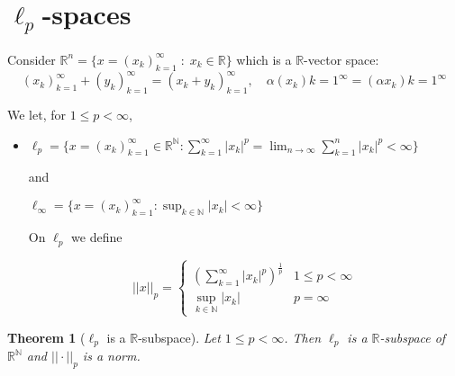 \documentclass[11pt, oneside]{book}
\theoremstyle{break}
\newtheorem{thm}{Theorem}[section]
\newcommand{\bb}[1]{\mathbb{#1}}			%
\begin{document}
\section{\texorpdfstring{$\ell_p$}{lp}-spaces}\label{sect:lp spaces}

Consider $\bb{R}^n = \{x = (x_k)_{k=1}^\infty \; : \; x_k \in \bb{R}\}$ which is a $\bb{R}$-vector space:
\begin{equation}
	(x_k)_{k=1}^\infty + (y_k)_{k=1}^\infty = (x_k + y_k)_{k = 1}^\infty, \quad \alpha(x_k){k=1}^\infty = (\alpha x_k){k=1}^\infty
\end{equation}

We let, for $1 \leq p < \infty$,
\begin{itemize}
	\item $\ell_p = \{x = (x_k)_{k=1}^\infty \in \bb{R}^\bb{N} : \sum_{k=1}^{\infty} |x_k|^p = \lim_{n \to \infty} \sum_{k=1}^{n} |x_k|^p < \infty \}$
		
		and

		$\ell_\infty = \{x = (x_k)_{k=1}^\infty : \sup_{k \in \bb{N}} |x_k| < \infty \}$

		On $\ell_p$ we define

		\begin{equation}
			||x||_p =
			\begin{cases}
				\left( \sum_{k=1}^{\infty} |x_k|^p \right)^{\frac{1}{p}}	&	1 \leq p < \infty \\
				\sup_{k \in \bb{N}} |x_k|		&		p = \infty
			\end{cases}
		\end{equation}
\end{itemize}

\begin{thm}[$\ell_p$ is a $\bb{R}$-subspace]
	Let $1 \leq p < \infty$. Then $\ell_p$ is a $\bb{R}$-subspace of $\bb{R}^\bb{N}$ and $||\cdot||_p$ is a norm.
\end{thm}
\end{document}

